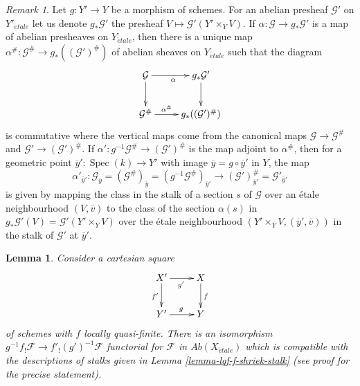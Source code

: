 \documentclass{stacks-project}
\theoremstyle{plain}
\newtheorem{lemma}[subsection]{Lemma}
\theoremstyle{definition}
\theoremstyle{remark}
\newtheorem{remark}[subsection]{Remark}
\numberwithin{equation}{subsection}
\def\Spec{\mathop{\mathrm{Spec}}}
\def\etale{{\acute{e}tale}}
\begin{document}
\begin{remark}
\label{remark-construct-map-presheaves-downstairs}
Let $g : Y' \to Y$ be a morphism of schemes.
For an abelian presheaf $\mathcal{G}'$ on $Y'_\etale$ let us denote
$g_*\mathcal{G}'$ the presheaf $V \mapsto \mathcal{G}'(Y' \times_Y V)$.
If $\alpha : \mathcal{G} \to g_*\mathcal{G}'$ is a map of abelian presheaves
on $Y_\etale$, then there is a unique map
$\alpha^\# : \mathcal{G}^\# \to g_*((\mathcal{G}')^\#)$
of abelian sheaves on $Y_\etale$ such that the diagram
$$
\xymatrix{
\mathcal{G} \ar[d] \ar[r]_\alpha & g_*\mathcal{G}' \ar[d] \\
\mathcal{G}^\# \ar[r]^-{\alpha^\#} & g_*((\mathcal{G}')^\#)
}
$$
is commutative where the vertical maps come from the canonical maps
$\mathcal{G} \to \mathcal{G}^\#$ and $\mathcal{G}' \to (\mathcal{G}')^\#$. If
$\alpha' : g^{-1}\mathcal{G}^\# \to (\mathcal{G}')^\#$
is the map adjoint to $\alpha^\#$, then for a geometric point
$\overline{y}' : \Spec(k) \to Y'$ with image
$\overline{y} = g \circ \overline{y}'$ in $Y$, the map
$$
\alpha'_{\overline{y}'} :
\mathcal{G}_{\overline{y}} =
(\mathcal{G}^\#)_{\overline{y}} =
(g^{-1}\mathcal{G}^\#)_{\overline{y}'}
\longrightarrow
(\mathcal{G}')^\#_{\overline{y}'} =
\mathcal{G}'_{\overline{y}'}
$$
is given by mapping the class in the stalk of a section $s$ of $\mathcal{G}$
over an \'etale neighbourhood $(V, \overline{v})$ to the class of the section
$\alpha(s)$ in $g_*\mathcal{G}'(V) = \mathcal{G}'(Y' \times_Y V)$
over the \'etale neighbourhood $(Y' \times_Y V, (\overline{y}', \overline{v}))$
in the stalk of $\mathcal{G}'$ at $\overline{y}'$.
\end{remark}

\begin{lemma}
\label{lemma-lqf-base-change-f-shriek}
Consider a cartesian square
$$
\xymatrix{
X' \ar[r]_{g'} \ar[d]_{f'} & X \ar[d]^f \\
Y' \ar[r]^g & Y
}
$$
of schemes with $f$ locally quasi-finite. There is an isomorphism
$g^{-1}f_!\mathcal{F} \to f'_!(g')^{-1}\mathcal{F}$ functorial for
$\mathcal{F}$ in $\textit{Ab}(X_\etale)$ which is compatible with
the descriptions of stalks given in Lemma \ref{lemma-lqf-f-shriek-stalk}
(see proof for the precise statement).
\end{lemma}
\end{document}
